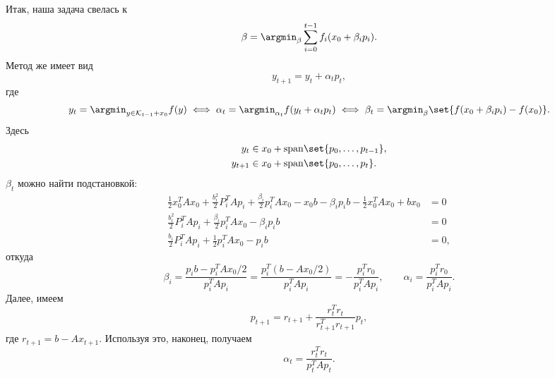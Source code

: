 Итак, наша задача свелась к
\begin{equation*}
    \beta = \argmin_{\beta} \sum_{i = 0}^{t - 1} f_i(x_0 + \beta_ip_i).
\end{equation*}
Метод же имеет вид
\begin{equation*}
    y_{t + 1} = y_t + \alpha_tp_t,
\end{equation*}
где
\begin{equation*}
    y_t = \argmin_{y \in \mathcal{K}_{t - 1} + x_0} f(y) \iff \alpha_t = \argmin_{\alpha_t} f(y_t + \alpha_tp_t) \iff \beta_t = \argmin_{\beta} \set{f(x_0 + \beta_ip_i) - f(x_0)}.
\end{equation*}
Здесь
\begin{align*}
    y_t &\in x_0 + \mathrm{span}\set{p_0, \ldots, p_{t - 1}}, \\
    y_{t + 1} &\in x_0 + \mathrm{span}\set{p_0, \ldots, p_t}.
\end{align*}
$\beta_t$ можно найти подстановкой:
\begin{align*}
    \frac12 x_0^TAx_0 + \frac{b_i^2}{2} P_i^TAp_i + \frac{\beta_i}{2}p_i^TAx_0 - x_0b - \beta_ip_i b - \frac12x_0^TAx_0 + bx_0 &= 0\\
    \frac{b_i^2}{2} P_i^TAp_i + \frac{\beta_i}{2}p_i^TAx_0 - \beta_ip_i b &= 0\\
    \frac{b_i}{2} P_i^TAp_i + \frac{1}{2}p_i^TAx_0 - p_i b &= 0,
\end{align*}
откуда
\begin{equation*}
    \beta_i = \frac{p_ib - p_i^TAx_0 / 2}{p_i^TAp_i} = \frac{p_i^T(b - Ax_0 / 2)}{p_i^TAp_i} = -\frac{p_i^Tr_0}{p_i^TAp_i}, \hspace{2em} \alpha_i = \frac{p_i^Tr_0}{p_i^TAp_i}.
\end{equation*}
Далее, имеем
\begin{equation*}
    p_{t + 1} = r_{t + 1} + \frac{r_t^Tr_t}{r_{t + 1}^Tr_{t + 1}}p_t,
\end{equation*}
где $r_{t + 1} = b - Ax_{t + 1}$. Используя это, наконец, получаем
\begin{equation*}
    \alpha_t = \frac{r_t^Tr_t}{p_t^TAp_t}.
\end{equation*}






    